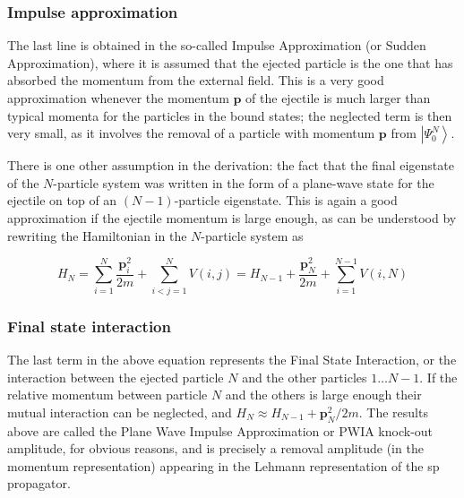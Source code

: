 \documentclass[compress]{beamer}
\begin{document}
{
\frametitle{Impulse approximation}
\begin{small}
{\scriptsize
    
The last line is obtained in the so-called Impulse Approximation (or
Sudden Approximation), where it is assumed that the ejected particle
is the one that has absorbed the momentum from the external
field. This is a very good approximation whenever the momentum
$\boldsymbol{p}$ of the ejectile is much larger than typical momenta
for the particles in the bound states; the neglected term 
is then very small, as it involves the removal of a particle with
momentum $\boldsymbol{p}$ from $\left|\Psi_{0}^{N}\right\rangle$.

There is one other assumption in the derivation: the fact that the
final eigenstate of the $N$-particle system was written in the form of
a plane-wave state for the ejectile on top of an $(N-1)$-particle
eigenstate. This is again a good approximation if the ejectile
momentum is large enough, as can be understood by rewriting the
Hamiltonian in the $N$-particle system as

$$
H_{N}=\sum_{i=1}^{N} \frac{\boldsymbol{p}_{i}^{2}}{2 m}+\sum_{i<j=1}^{N} V(i, j)=H_{N-1}+\frac{\boldsymbol{p}_{N}^{2}}{2 m}+\sum_{i=1}^{N-1} V(i, N)
$$


}
\end{small}
}
\frame
{
\frametitle{Final state interaction}
\begin{small}
{\scriptsize
The last term in the above equation represents the Final State Interaction, or
the interaction between the ejected particle $N$ and the other
particles $1 \ldots N-1$. If the relative momentum between particle
$N$ and the others is large enough their mutual interaction can be
neglected, and $H_{N} \approx H_{N-1}+\boldsymbol{p}_{N}^{2} / 2
m$. The results above are called the Plane Wave Impulse
Approximation or PWIA knock-out amplitude, for obvious reasons, and is
precisely a removal amplitude (in the momentum representation)
appearing in the Lehmann representation of the sp propagator.

}
\end{small}
}
\frame
\end{document}
